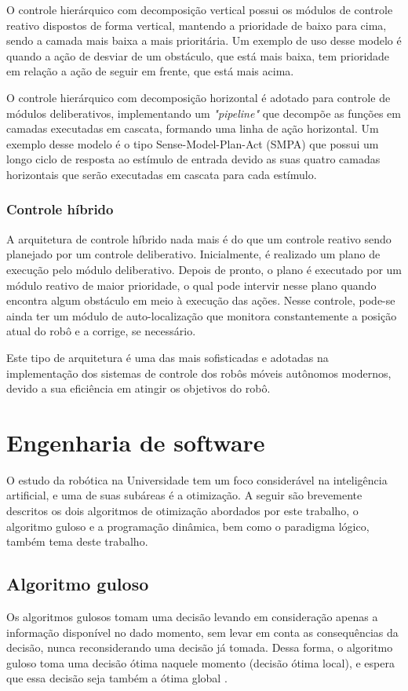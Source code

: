 O controle hierárquico com decomposição vertical possui os módulos de controle reativo dispostos de forma vertical, mantendo a prioridade de baixo para cima, sendo a camada mais baixa a mais prioritária. Um exemplo de uso desse modelo é quando a ação de desviar de um obstáculo, que está mais baixa, tem prioridade em relação a ação de seguir em frente, que está mais acima.

O controle hierárquico com decomposição horizontal é adotado para controle de módulos deliberativos, implementando um \textit{"pipeline"} que decompõe as funções em camadas executadas em cascata, formando uma linha de ação horizontal. Um exemplo desse modelo é o tipo Sense-Model-Plan-Act (SMPA) que possui um longo ciclo de resposta ao estímulo de entrada devido as suas quatro camadas horizontais que serão executadas em cascata para cada estímulo.

\subsubsection{Controle híbrido}
A arquitetura de controle híbrido nada mais é do que um controle reativo sendo planejado por um controle deliberativo. Inicialmente, é realizado um plano de execução pelo módulo deliberativo. Depois de pronto, o plano é executado por um módulo reativo de maior prioridade, o qual pode intervir nesse plano quando encontra algum obstáculo em meio à execução das ações. Nesse controle, pode-se ainda ter um módulo de auto-localização que monitora constantemente a posição atual do robô e a corrige, se necessário.

Este tipo de arquitetura é uma das mais sofisticadas e adotadas na implementação dos sistemas de controle dos robôs móveis autônomos modernos, devido a sua eficiência em atingir os objetivos do robô. 

\section{Engenharia de software}
O estudo da robótica na Universidade tem um foco considerável na inteligência artificial, e uma de suas subáreas é a otimização. A seguir são brevemente descritos os dois algoritmos de otimização abordados por este trabalho, o algoritmo guloso e a programação dinâmica, bem como o paradigma lógico, também tema deste trabalho.
\subsection{Algoritmo guloso}
Os algoritmos gulosos tomam uma decisão levando em consideração apenas a informação disponível no dado momento, sem levar em conta as consequências da decisão, nunca reconsiderando uma decisão já tomada. Dessa forma, o algoritmo guloso toma uma decisão ótima naquele momento (decisão ótima local), e espera que essa decisão seja também a ótima global \cite{anderson2004}.
